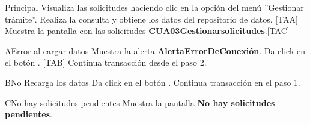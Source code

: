\begin{UCtrayectoria}{Principal}
  \UCpaso[\UCactor] Visualiza las solicitudes haciendo clic en la opción del menú ''Gestionar trámite''.
  \UCpaso Realiza la consulta y obtiene los datos del repositorio de datos. [TAA]
  \UCpaso Muestra la pantalla con las solicitudes {\bf CUA03Gestionarsolicitudes}.[TAC]
\end{UCtrayectoria}

\begin{UCtrayectoriaA}{A}{Error al cargar datos} 
\UCpaso Muestra la alerta {\bf AlertaErrorDeConexión}.
  \UCpaso[\UCactor] Da click en el botón . [TAB]
  \UCpaso Continua transacción desde el paso 2.
\end{UCtrayectoriaA}

\begin{UCtrayectoriaA}{B}{No Recarga los datos} 
  \UCpaso Da click en el botón .
  \UCpaso Continua transacción en el paso 1.
\end{UCtrayectoriaA}

\begin{UCtrayectoriaA}{C}{No hay solicitudes pendientes} 
  \UCpaso Muestra la pantalla {\bf No hay solicitudes pendientes}.
\end{UCtrayectoriaA}

